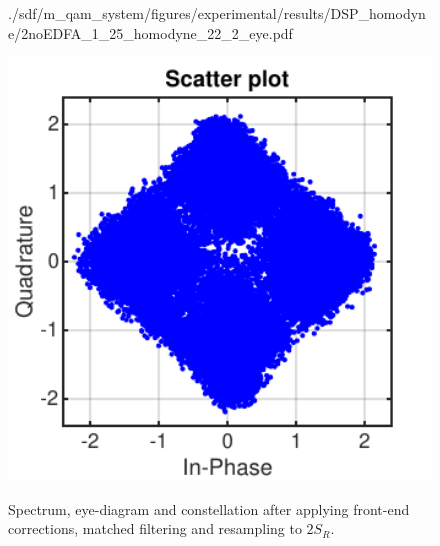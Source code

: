 \begin{figure}[H]
\begin{minipage}{0.30\textwidth}
			{./sdf/m_qam_system/figures/experimental/results/DSP_homodyne/2noEDFA_1_25_homodyne_22_2_eye.pdf}
			\label{fig:1250MBdSpecMF}
		\end{minipage}
		\begin{minipage}{0.30\textwidth}
			\centering
			\includegraphics[width=1\textwidth]
			{./sdf/m_qam_system/figures/experimental/results/DSP_homodyne/2noEDFA_1_25_homodyne_22_2_const.pdf}\\
			\label{fig:1250MBdSpecBefFec}
		\end{minipage}
		\caption{Spectrum, eye-diagram and constellation after applying front-end corrections, matched filtering and resampling to $2 S_R$.}
		\label{fig:1250MBMFHm}
	\end{figure}


